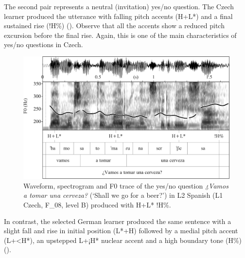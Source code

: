 The second pair represents a neutral (invitation) yes/no question. The Czech learner produced the utterance with falling pitch accents (H+L*) and a final sustained rise (!H\%) (). Observe that all the accents show a reduced pitch excursion before the final rise. Again, this is one of the main characteristics of yes/no questions in Czech.

\begin{figure}


\includegraphics[width=\textwidth]{figures/Figure_4.74.png}



\caption{Waveform, spectrogram and F0 trace of the yes/no question \textit{¿Vamos a tomar una cerveza?} (‘Shall we go for a beer?’) in L2 Spanish (L1 Czech, F\_08, level B) produced with H+L* !H\%.}
\label{fig:4.74}
\end{figure}

In contrast, the selected German learner produced the same sentence with a slight fall and rise in initial position (L*+H) followed by a medial pitch accent (L+<H*), an upstepped L+¡H* nuclear accent and a high boundary tone (H\%) ().

